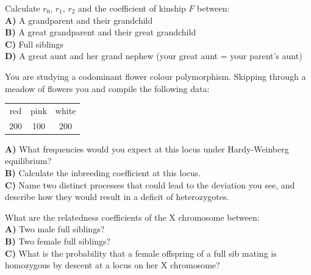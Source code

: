 \begin{question}{}
Calculate $r_{0}$, $r_{1}$, $r_{2}$ and the coefficient of kinship $F$ between:\\
{\bf A)} A grandparent and their grandchild\\
{\bf B)} A great grandparent and their great grandchild\\
{\bf C)} Full siblings\\
{\bf D)} A great aunt and her grand nephew (your great aunt = your parent's aunt)\\
\end{question}

\begin{question}{}
You are studying a codominant flower colour polymorphism. Skipping
through a meadow of flowers you and compile the following data:
\begin{center}
\begin{tabular}{ccc}
red & pink & white\\
200 & 100 & 200\\
\end{tabular}
\end{center}
{\bf A)} What frequencies would you expect at this locus under Hardy-Weinberg equilibrium? \\
{\bf B)} Calculate the inbreeding coefficient at this locus.\\ 
{\bf C)} Name two distinct processes that could lead to the deviation
you see, and describe how they would result in a deficit of heterozygotes.
\end{question}



\begin{question}{}
What are the relatedness coefficients of the X chromosome between:\\
{\bf A)} Two male full siblings?\\
{\bf B)} Two female full siblings?\\
{\bf C)} What is the probability that a female offspring of a full sib
mating is homozygous by descent at a locus on her X chromosome?
\end{question}

